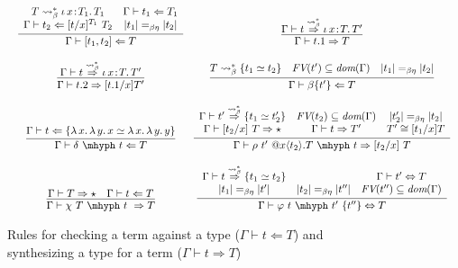 \documentclass{article}
\newcommand{\abs}[4]{{#1}\, #2\! : \! #3.\, #4}
\newcommand{\absu}[3]{{#1}\, #2.\, #3}
\newcommand{\tpcheck}[0]{\Leftarrow}
\newcommand{\tpsynth}[0]{\Rightarrow}
\newcommand{\tpsynthleads}[0]{\ensuremath{\overset{\leadsto_\beta^*}{\Rightarrow}}}
\begin{document}
\begin{figure}
\[\begin{array}{c}
\begin{array}{cc}
    \infer{\Gamma\vdash [ t_1 , t_2 ] \tpcheck T}
          {
           \begin{array}{cc}
             T \leadsto_\beta^* \abs{\iota}{x}{T_1}{T_1}
             & \Gamma \vdash t_1 \tpcheck T_1
             \\ \Gamma \vdash t_2 \tpcheck [t/x]^{T_1}\ T_2
             & |t_1| =_{\beta\eta} |t_2|
           \end{array}
          } &
    \infer{\Gamma\vdash t.1 \tpsynth T}{\Gamma\vdash t \tpsynthleads \abs{\iota}{x}{T}{T'}} \\ \\
    \infer{\Gamma\vdash t.2 \tpsynth [t.1/x] T'}{\Gamma\vdash t \tpsynthleads \abs{\iota}{x}{T}{T'}} &
    \infer{\Gamma\vdash \beta\{t'\} \tpcheck T}
          {T \leadsto_\beta^* \{t_1 \simeq t_2\} \quad \textit{FV}(t')\subseteq \textit{dom}(\Gamma) \quad |t_1| =_{\beta\eta} |t_2|}  \\ \\    
    \infer{\Gamma\vdash \delta\ \mhyph\ t \tpcheck T}
          {\Gamma\vdash t\tpcheck \{\absu{\lambda}{x}{\absu{\lambda}{y}{x}} \simeq \absu{\lambda}{x}{\absu{\lambda}{y}{y}}\}} &
    \infer{\Gamma \vdash \rho\ t'\ @x\langle t_2 \rangle.T\ \mhyph\ t \tpsynth [t_2/x]\ T}
          {
          \begin{array}{ccc}
            \Gamma \vdash t' \tpsynthleads \{t_1 \simeq t_2'\}
            & \textit{FV}(t_2) \subseteq \textit{dom}(\Gamma)
            & |t_2'| =_{\beta\eta} |t_2|
            \\ \Gamma \vdash [t_2/x]\ T \tpsynth \star
            & \Gamma \vdash t \tpsynth T'
            & T' \cong [t_1/x]T
          \end{array}
          } \\ \\
    \infer{\Gamma \vdash \chi\ T\ \mhyph\ t\ \tpsynth T}
          {\Gamma \vdash T \tpsynth \star & \Gamma \vdash t \tpcheck T} &
    \infer{\Gamma\vdash \varphi\ t\ \mhyph\ t'\ \{t''\} \Leftrightarrow T}
          {
            \begin{array}{ccc}
              \Gamma\vdash t\tpsynthleads \{t_1\simeq t_2\}
              &
              & \Gamma\vdash t' \Leftrightarrow T
              \\ |t_1| =_{\beta\eta} |t'|
              & |t_2| =_{\beta\eta} |t''|
              & \textit{FV}(t'') \subseteq \textit{dom}(\Gamma)
            \end{array}
          }
  \end{array}
    \end{array}
  \]
\caption{Rules for checking a term against a type ($\Gamma \vdash t \tpcheck T$)
           and synthesizing a type for a term ($\Gamma \vdash t \tpsynth T$)}
\label{fig:tp}
\end{figure}
\end{document}
